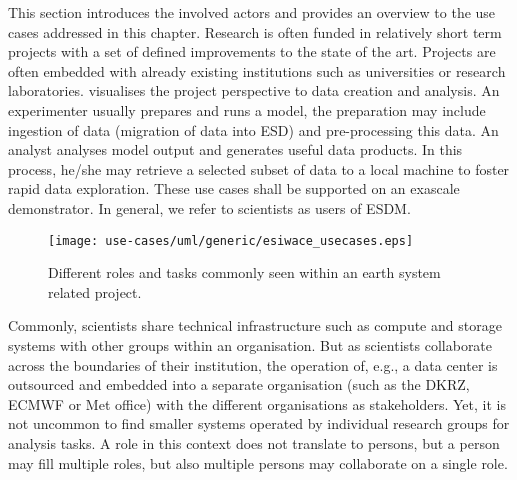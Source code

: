 This section introduces the involved actors and provides an overview to the use cases addressed in this chapter.
Research is often funded in relatively short term projects with a set of defined improvements to the state of the art.
Projects are often embedded with already existing institutions such as universities or research laboratories.
 visualises the project perspective to data creation and analysis.
An experimenter usually prepares and runs a model, the preparation may include ingestion of data (migration of data into ESD) and pre-processing this data.
An analyst analyses model output and generates useful data products.
In this process, he/she may retrieve a selected subset of data to a local machine to foster rapid data exploration.
These use cases shall be supported on an exascale demonstrator.
In general, we refer to scientists as users of ESDM.



\begin{figure}
	\centering
	\texttt{[image: use-cases/uml/generic/esiwace\_usecases.eps]}
	\caption{Different roles and tasks commonly seen within an earth system related project.}
	\label{fig:esiwace_usecases}
\end{figure}



\medskip

Commonly, scientists share technical infrastructure such as compute and storage systems with other groups within an organisation.
But as scientists collaborate across the boundaries of their institution, the operation of, e.g., a data center is outsourced and embedded into a separate organisation (such as the DKRZ, ECMWF or Met office) with the different organisations as stakeholders.
Yet, it is not uncommon to find smaller systems operated by individual research groups for analysis tasks.
A role in this context does not translate to persons, but a person may fill multiple roles, but also multiple persons may collaborate on a single role.




